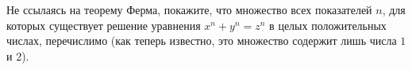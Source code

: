 Не ссылаясь на теорему Ферма, покажите, что множество всех показателей $n$, для которых существует решение уравнения $x^n +
y^n = z^n$ в целых положительных числах, перечислимо (как теперь известно, это множество содержит лишь числа $1$ и $2$). 